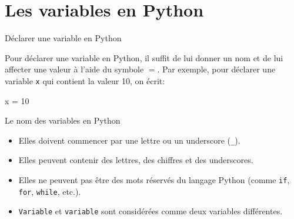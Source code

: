 \def\level{Première}  %
\def\course{NSI}
\def\chaptername{Constructions élémentaires} %
\def\docname{AP01}        %

\pagestyle{cours_FP}
\makeheader{} %


\section{Les variables en Python}

\begin{easybox}{Déclarer une variable en Python}

	Pour déclarer une variable en Python, il suffit de lui donner un nom et de lui affecter une valeur à l'aide du symbole $=$. Par exemple, pour déclarer une variable \texttt{x} qui contient la valeur 10, on écrit:

\begin{minipage}{0.48\linewidth}
	\begin{CodePythontexAlt}[Largeur=1\linewidth,Centre,Lignes=true,PremLigne=1, Lignes=false,]{}
    x = 10
    \end{CodePythontexAlt}
\end{minipage}\hfill{}
\begin{minipage}{0.38\linewidth}
    \begin{center}
    \begin{scratch}
\end{scratch}
    \end{center}

\end{minipage}
\end{easybox}


\begin{easybox}{Le nom des variables en Python}
	\begin{itemize}
		\item Elles doivent commencer par une lettre ou un underscore (\texttt{\_}).
		\item Elles peuvent contenir des lettres, des chiffres et des underscores.
		\item Elles ne peuvent pas être des mots réservés du langage Python (comme \texttt{if}, \texttt{for}, \texttt{while}, etc.).
		\item \texttt{Variable} et \texttt{variable} sont considérées comme deux variables différentes.
	\end{itemize}
\end{easybox}


